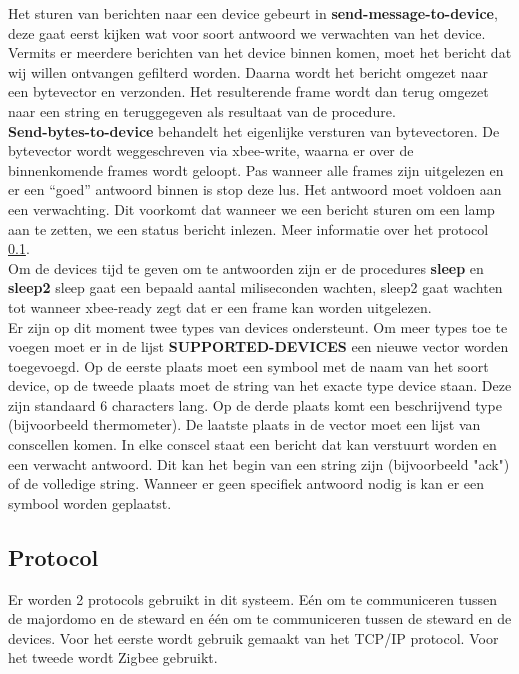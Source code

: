\documentclass{article}
\begin{document}
Het sturen van berichten naar een device gebeurt in \textbf{send-message-to-device}, deze gaat eerst kijken wat voor soort antwoord we verwachten van het device. Vermits er meerdere berichten van het device binnen komen, moet het bericht dat wij willen ontvangen gefilterd worden.  Daarna wordt het bericht omgezet naar een bytevector en verzonden. Het resulterende frame wordt dan terug omgezet naar een string en teruggegeven als resultaat van de procedure.\\
\textbf{Send-bytes-to-device} behandelt het eigenlijke versturen van bytevectoren. De bytevector wordt weggeschreven via xbee-write, waarna er over de binnenkomende frames wordt geloopt. Pas wanneer alle frames zijn uitgelezen en er een ``goed'' antwoord binnen is stop deze lus. Het antwoord moet voldoen aan een verwachting. Dit voorkomt dat wanneer we een bericht sturen om een lamp aan te zetten, we een status bericht inlezen. Meer informatie over het protocol \ref{sub:protocol}.\\
Om de devices tijd te geven om te antwoorden zijn er de procedures \textbf{sleep} en \textbf{sleep2} sleep gaat een bepaald aantal miliseconden wachten, sleep2 gaat wachten tot wanneer xbee-ready zegt dat er een frame kan worden uitgelezen.\\
Er zijn op dit moment twee types van devices ondersteunt. Om meer types toe te voegen moet er in de lijst \textbf{SUPPORTED-DEVICES} een nieuwe vector worden toegevoegd. Op de eerste plaats moet een symbool met de naam van het soort device, op de tweede plaats moet de string van het exacte type device staan. Deze zijn standaard 6 characters lang. Op de derde plaats komt een beschrijvend type (bijvoorbeeld thermometer). De laatste plaats in de vector moet een lijst van conscellen komen. In elke conscel staat een bericht dat kan verstuurt worden en een verwacht antwoord. Dit kan het begin van een string zijn (bijvoorbeeld "ack") of de volledige string. Wanneer er geen specifiek antwoord nodig is kan er een symbool worden geplaatst.\\



\subsection{Protocol}
\label{sub:protocol}
Er worden 2 protocols gebruikt in dit systeem. E\'en om te communiceren tussen de majordomo en de steward en \'e\'en om te communiceren tussen de steward en de devices. Voor het eerste wordt gebruik gemaakt van het TCP/IP protocol. Voor het tweede wordt Zigbee gebruikt.
\end{document}
